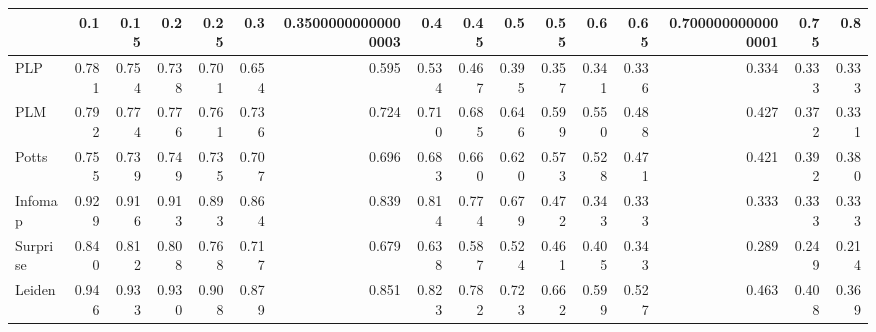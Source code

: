 \begin{tabular}{lrrrrrrrrrrrrrrr}
\toprule
{} &   0.1 &  0.15 &   0.2 &  0.25 &   0.3 & 0.35000000000000003 &   0.4 &  0.45 &   0.5 &  0.55 &   0.6 &  0.65 & 0.7000000000000001 &  0.75 &   0.8 \\
\midrule
PLP      & 0.781 & 0.754 & 0.738 & 0.701 & 0.654 &               0.595 & 0.534 & 0.467 & 0.395 & 0.357 & 0.341 & 0.336 &              0.334 & 0.333 & 0.333 \\
PLM      & 0.792 & 0.774 & 0.776 & 0.761 & 0.736 &               0.724 & 0.710 & 0.685 & 0.646 & 0.599 & 0.550 & 0.488 &              0.427 & 0.372 & 0.331 \\
Potts    & 0.755 & 0.739 & 0.749 & 0.735 & 0.707 &               0.696 & 0.683 & 0.660 & 0.620 & 0.573 & 0.528 & 0.471 &              0.421 & 0.392 & 0.380 \\
Infomap  & 0.929 & 0.916 & 0.913 & 0.893 & 0.864 &               0.839 & 0.814 & 0.774 & 0.679 & 0.472 & 0.343 & 0.333 &              0.333 & 0.333 & 0.333 \\
Surprise & 0.840 & 0.812 & 0.808 & 0.768 & 0.717 &               0.679 & 0.638 & 0.587 & 0.524 & 0.461 & 0.405 & 0.343 &              0.289 & 0.249 & 0.214 \\
Leiden   & 0.946 & 0.933 & 0.930 & 0.908 & 0.879 &               0.851 & 0.823 & 0.782 & 0.723 & 0.662 & 0.599 & 0.527 &              0.463 & 0.408 & 0.369 \\
\bottomrule
\end{tabular}
